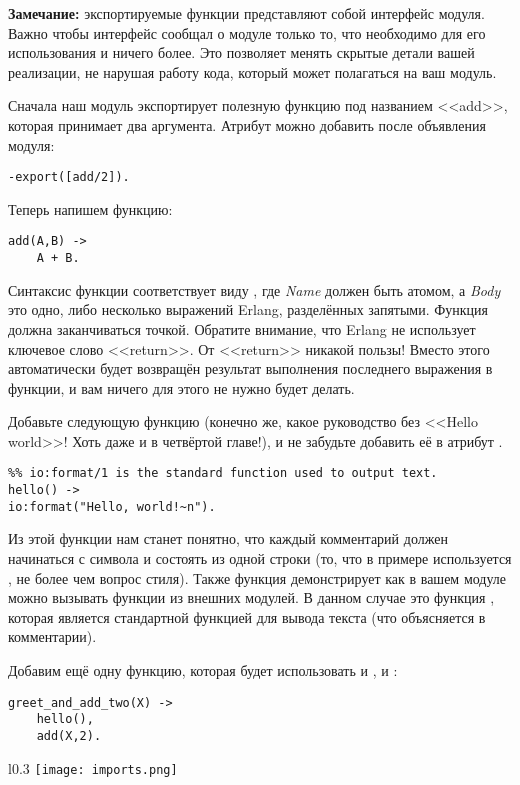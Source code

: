 \colorbox{lgray}{
    \begin{minipage}{1\linewidth}
        \textbf{Замечание:} экспортируемые функции представляют собой интерфейс модуля.
        Важно чтобы интерфейс сообщал о модуле только то, что необходимо для его использования и ничего более.
        Это позволяет менять скрытые детали вашей реализации, не нарушая работу кода, который может полагаться на ваш модуль.
    \end{minipage}
}

Сначала наш модуль экспортирует полезную функцию под названием <<add>>, которая принимает два аргумента.
Атрибут  можно добавить после объявления модуля:
\begin{lstlisting}[style=repl]
-export([add/2]).
\end{lstlisting}

Теперь напишем функцию:
\begin{lstlisting}[style=erlang]
add(A,B) ->
    A + B.
\end{lstlisting}

Синтаксис функции соответствует виду , где \emph{Name} должен быть атомом, а \emph{Body} это одно, либо несколько выражений Erlang, разделённых запятыми.
Функция должна заканчиваться точкой.
Обратите внимание, что Erlang не использует ключевое слово <<return>>.
От <<return>> никакой пользы!
Вместо этого автоматически будет возвращён результат выполнения последнего выражения в функции, и вам ничего для этого не нужно будет делать.

Добавьте следующую функцию (конечно же, какое руководство без <<Hello world>>!
Хоть даже и в четвёртой главе!), и не забудьте добавить её в атрибут .
\begin{lstlisting}[style=erlang]
%% Shows greetings.
%% io:format/1 is the standard function used to output text.
hello() ->
io:format("Hello, world!~n").
\end{lstlisting}

Из этой функции нам станет понятно, что каждый комментарий должен начинаться с символа \ops{\%} и состоять из одной строки (то, что в примере используется \ops{\%\%}, не более чем вопрос стиля).
Также функция  демонстрирует как в вашем модуле можно вызывать функции из внешних модулей.
В данном случае это функция , которая является стандартной функцией для вывода текста (что объясняется в комментарии).

Добавим ещё одну функцию, которая будет использовать и , и :
\begin{lstlisting}[style=erlang]
greet_and_add_two(X) ->
    hello(),
    add(X,2).
\end{lstlisting}
\begin{wrapfigure}[8]{l}{0.3\linewidth}
    \texttt{[image: imports.png]}
\end{wrapfigure}

